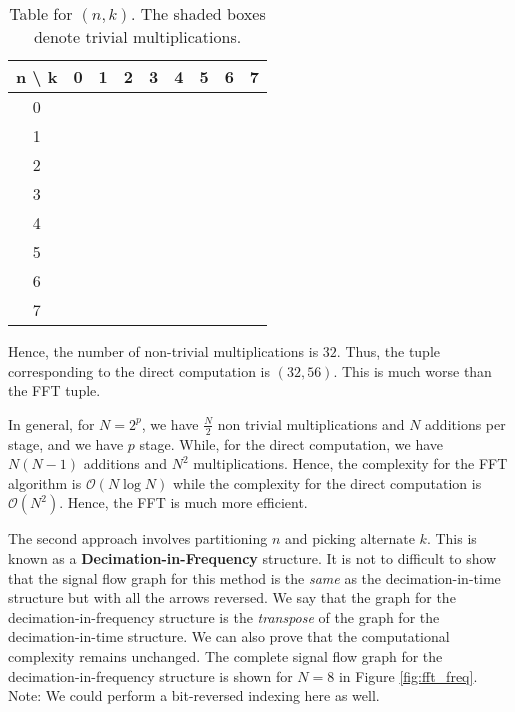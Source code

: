 \documentclass{article}
\theoremstyle{definition}
\begin{document}
\begin{table}[H]
    \begin{adjustbox}{center}
    \begin{tabular}{|c|c|c|c|c|c|c|c|c|}
        \hline
        n \textbackslash \; k & 0 & 1 & 2 & 3 & 4 & 5 & 6 & 7 \\
        \hline
        0 & \cellcolor{shade} & \cellcolor{shade} & \cellcolor{shade} & \cellcolor{shade} & \cellcolor{shade} & \cellcolor{shade} & \cellcolor{shade} & \cellcolor{shade} \\
        \hline
        1 & \cellcolor{shade} & & & & \cellcolor{shade} & & & \\
        \hline
        2 & \cellcolor{shade} & &\cellcolor{shade} & & \cellcolor{shade} & & \cellcolor{shade}& \\
        \hline
        3 & \cellcolor{shade} & & & & \cellcolor{shade} & & & \\
        \hline
        4 & \cellcolor{shade} & \cellcolor{shade} & \cellcolor{shade} & \cellcolor{shade} & \cellcolor{shade} & \cellcolor{shade} & \cellcolor{shade} & \cellcolor{shade} \\
        \hline
        5 & \cellcolor{shade} & & & & \cellcolor{shade} & & & \\
        \hline
        6 & \cellcolor{shade} & &\cellcolor{shade} & & \cellcolor{shade} & & \cellcolor{shade}& \\
        \hline
        7 & \cellcolor{shade} & & & & \cellcolor{shade} & & & \\
        \hline
    \end{tabular}
    \end{adjustbox}
    \caption{Table for $(n,k)$. The shaded boxes denote trivial multiplications.}
    \label{table:nk}
\end{table}

Hence, the number of non-trivial multiplications is $32$. Thus, the tuple corresponding to the direct computation is $(32,56)$. This is much worse than the FFT tuple. \medskip

In general, for $N = 2^p$, we have $\frac{N}{2}$ non trivial multiplications and $N$ additions per stage, and we have $p$ stage. While, for the direct computation, we have $N(N-1)$ additions and $N^2$ multiplications. Hence, the complexity for the FFT algorithm is $\mathcal{O}(N \log N)$ while the complexity for the direct computation is $\mathcal{O}(N^2)$. Hence, the FFT is much more efficient. \medskip

The second approach involves partitioning $n$ and picking alternate $k$. This is known as a \textbf{Decimation-in-Frequency} structure. It is not to difficult to show that the signal flow graph for this method is the \textit{same} as the decimation-in-time structure but with all the arrows reversed. We say that the graph for the decimation-in-frequency structure is the \textit{transpose} of the graph for the decimation-in-time structure. We can also prove that the computational complexity remains unchanged. The complete signal flow graph for the decimation-in-frequency structure is shown for $N=8$ in Figure \ref{fig:fft_freq}. Note: We could perform a bit-reversed indexing here as well. 
\end{document}
